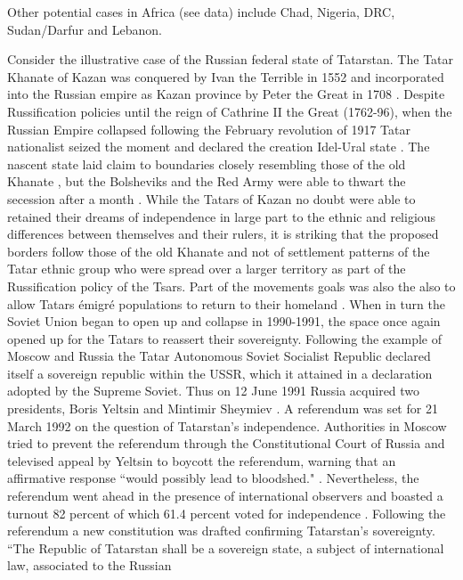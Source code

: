 \documentclass[12pt]{article}
\begin{document}
\begin{multicols}{2}
Other potential cases in Africa (see data) include Chad, Nigeria, DRC,
Sudan/Darfur and Lebanon.

Consider the illustrative case of the Russian federal state of Tatarstan. The
Tatar Khanate of Kazan was conquered by Ivan the Terrible in 1552 and
incorporated into the Russian empire as Kazan province by Peter the Great in
1708 \citep{Sharifzhanov_2007}. Despite Russification policies until the reign
of Cathrine II the Great (1762-96), when the Russian Empire collapsed following
the February revolution of 1917 Tatar nationalist seized the moment and declared
the creation Idel-Ural state \citep{Devlet_1993}. The nascent state laid claim
to boundaries closely resembling those of the old Khanate \citep{Hartley2020},
but the Bolsheviks and the Red Army were able to thwart the secession after a
month \citep{Hartley2020}. While the Tatars of Kazan no doubt were able to
retained their dreams of independence in large part to the ethnic and religious
differences between themselves and their rulers, it is striking that the
proposed borders follow those of the old Khanate and not of settlement patterns
of the Tatar ethnic group who were spread over a larger territory as part of the
Russification policy of the Tsars. Part of the movements goals was also the also
to allow Tatars émigré populations to return to their homeland
\citep{Devlet_1993}. When in turn the Soviet Union began to open up and collapse
in 1990-1991, the space once again opened up for the Tatars to reassert their
sovereignty. Following the example of Moscow and Russia the Tatar Autonomous
Soviet Socialist Republic declared itself a sovereign republic within the USSR,
which it attained in a declaration adopted by the Supreme Soviet. Thus on 12
June 1991 Russia acquired two presidents, Boris Yeltsin and Mintimir Sheymiev
\citep{Sharifzhanov_2007}. A referendum was set for 21 March 1992 on the
question of Tatarstan's independence. Authorities in Moscow tried to prevent
the referendum through the Constitutional Court of Russia and televised appeal
by Yeltsin to boycott the referendum, warning that an affirmative response
``would possibly lead to bloodshed." \citep{Sharifzhanov_2007}.  Nevertheless,
the referendum went ahead in the presence of international observers and boasted
a turnout 82 percent of which 61.4 percent voted for independence
\citep{Devlet_1993}. Following the referendum a new constitution was drafted
confirming Tatarstan's sovereignty. ``The Republic of Tatarstan shall be a
sovereign state, a subject of international law, associated to the Russian

\end{multicols}
\end{document}

